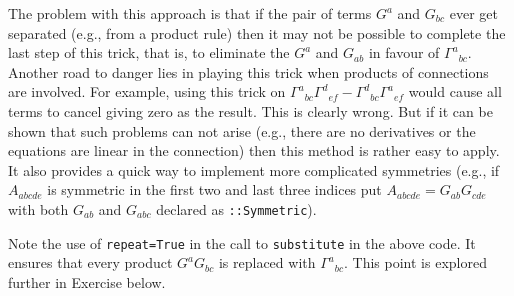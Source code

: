 \documentclass[a4paper,12pt]{article}
\numberwithin{equation}{section}%
\begin{document}
The problem with this approach is that if the pair of terms $G^{a}$ and $G_{bc}$ ever get
separated (e.g., from a product rule) then it may not be possible to complete the last step
of this trick, that is, to eliminate the $G^{a}$ and $G_{ab}$ in favour of
$\Gamma^{a}{}_{bc}$. Another road to danger lies in playing this trick when products of
connections are involved. For example, using this trick on
$\Gamma^{a}{}_{bc}\Gamma^{d}{}_{ef} - \Gamma^{d}{}_{bc}\Gamma^{a}{}_{ef}$ would cause all
terms to cancel giving zero as the result. This is clearly wrong. But if it can be shown
that such problems can not arise (e.g., there are no derivatives or the equations are linear
in the connection) then this method is rather easy to apply. It also provides a quick way to
implement more complicated symmetries (e.g., if $A_{abcde}$ is symmetric in the first two
and last three indices put $A_{abcde} = G_{ab}G_{cde}$ with both $G_{ab}$ and $G_{abc}$
declared as \verb|::Symmetric|).

Note the use of \verb|repeat=True| in the call to \verb|substitute| in the above code.
It ensures that every product $G^{a} G_{b c}$ is replaced with $\Gamma^{a}{}_{b c}$. This
point is explored further in Exercise  below.

\end{document}
